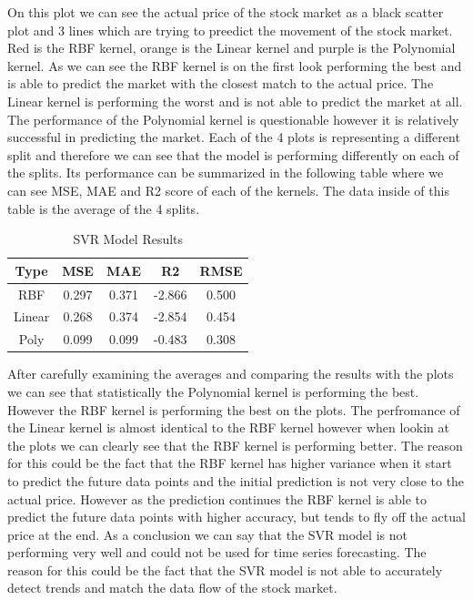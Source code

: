 \documentclass{imc-inf}
\begin{document}
			On this plot we can see the actual price of the stock market as a black scatter plot and 3 lines which are trying to preedict the movement of the stock market. Red is the RBF kernel, orange is the Linear kernel and purple is the Polynomial kernel.
			As we can see the RBF kernel is on the first look performing the best and is able to predict the market with the closest match to the actual price. The Linear kernel is performing the worst and is not able to predict the market at all.
			The performance of the Polynomial kernel is questionable however it is relatively successful in predicting the market. Each of the 4 plots is representing a different split and therefore we can see that the model is performing differently on each of the splits.
			Its performance can be summarized in the following table where we can see MSE, MAE and R2 score of each of the kernels. The data inside of this table is the average of the 4 splits.
			
			
			\begin{table}[h!]
				\centering
				\begin{tabular}{|c|c|c|c|c|}
					\hline
					\textbf{Type} & \textbf{MSE} & \textbf{MAE} & \textbf{R2} & \textbf{RMSE} \\ \hline
					RBF & 0.297 & 0.371 & -2.866 & 0.500 \\ \hline
					Linear & 0.268 & 0.374 & -2.854 & 0.454\\ \hline
					Poly & 0.099 & 0.099 & -0.483 &  0.308 \\ \hline
				\end{tabular}
				\caption{SVR Model Results}
				\label{tab:svr_model_results}
			\end{table}
			After carefully examining the averages and comparing the results with the plots we can see that statistically the Polynomial kernel is performing the best. However the RBF kernel is performing the best on the plots.
			 The perfromance of the Linear kernel is almost identical to the RBF kernel however when lookin at the plots we can clearly see that the RBF kernel is performing better. The reason for this could be the fact that the RBF kernel has higher variance
			 when it start to predict the future data points and the initial prediction is not very close to the actual price. However as the prediction continues the RBF kernel is able to predict the future data points with higher accuracy, 
			 but tends to fly off the actual price at the end. As a conclusion we can say that the SVR model is not performing very well and could not be used for time series forecasting. The reason for this could be the fact that the SVR model is not able to 
			accurately detect trends and match the data flow of the stock market.
\end{document}
